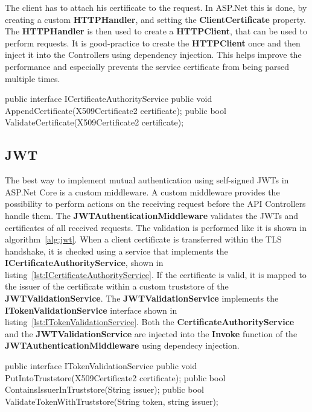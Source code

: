 The client has to attach his certificate to the request.
In ASP.Net this is done, by creating a custom \textbf{HTTPHandler}, and setting the \textbf{ClientCertificate} property.
The \textbf{HTTPHandler} is then used to create a \textbf{HTTPClient}, that can be used to perform requests.
It is good-practice to create the \textbf{HTTPClient} once and then inject it into the Controllers using dependency injection.
This helps improve the performance and especially prevents the service certificate from being parsed multiple times.

\noindent \begin{minipage}{\linewidth}
	\begin{CsCode}[label={lst:ICertificateAuthorityService}, caption={ICertificateAuthorityService interface that is, implemented by the injected CertificateAuthorityService},captionpos=b]
		public interface ICertificateAuthorityService {
			public void AppendCertificate(X509Certificate2 certificate);
			public bool ValidateCertificate(X509Certificate2 certificate);
		}
	\end{CsCode}
\end{minipage}

\subsection{JWT}
The best way to implement mutual authentication using self-signed JWTs in ASP.Net Core is a custom middleware.
A custom middleware provides the possibility to perform actions on the receiving request before the API Controllers handle them.
The \textbf{JWTAuthenticationMiddleware} validates the JWTs and certificates of all received requests.
The validation is performed like it is shown in algorithm~\ref{alg:jwt}.
When a client certificate is transferred within the TLS handshake, it is checked using a service that implements the \textbf{ICertificateAuthorityService}, shown in listing~\ref{lst:ICertificateAuthorityService}.
If the certificate is valid, it is mapped to the issuer of the certificate within a custom truststore of the \textbf{JWTValidationService}.
The \textbf{JWTValidationService} implements the \textbf{ITokenValidationService} interface shown in listing~\ref{lst:ITokenValidationService}.
Both the \textbf{CertificateAuthorityService} and the \textbf{JWTValidationService} are injected into the \textbf{Invoke} function of the \textbf{JWTAuthenticationMiddleware} using dependecy injection.

\noindent \begin{minipage}{\linewidth}
	\begin{CsCode}[label={lst:ITokenValidationService}, caption={ITokenValidationService interface, that is implemented by the injected JWTValidationService},captionpos=b]
		public interface ITokenValidationService {
			public void PutIntoTruststore(X509Certificate2 certificate);
			public bool ContainsIssuerInTruststore(String issuer);
			public bool ValidateTokenWithTruststore(String token, string issuer);
		}
	\end{CsCode}
\end{minipage}

